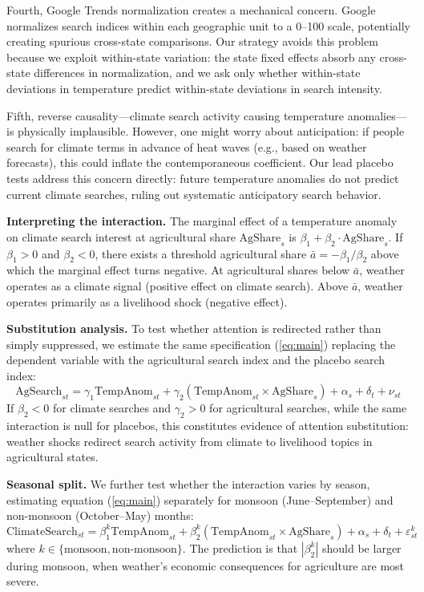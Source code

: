 \documentclass[12pt]{article}
\begin{document}
Fourth, Google Trends normalization creates a mechanical concern. Google normalizes search indices within each geographic unit to a 0--100 scale, potentially creating spurious cross-state comparisons. Our strategy avoids this problem because we exploit within-state variation: the state fixed effects absorb any cross-state differences in normalization, and we ask only whether within-state deviations in temperature predict within-state deviations in search intensity.

Fifth, reverse causality---climate search activity causing temperature anomalies---is physically implausible. However, one might worry about anticipation: if people search for climate terms in advance of heat waves (e.g., based on weather forecasts), this could inflate the contemporaneous coefficient. Our lead placebo tests address this concern directly: future temperature anomalies do not predict current climate searches, ruling out systematic anticipatory search behavior.

\textbf{Interpreting the interaction.} The marginal effect of a temperature anomaly on climate search interest at agricultural share $\text{AgShare}_s$ is $\beta_1 + \beta_2 \cdot \text{AgShare}_s$. If $\beta_1 > 0$ and $\beta_2 < 0$, there exists a threshold agricultural share $\bar{a} = -\beta_1/\beta_2$ above which the marginal effect turns negative. At agricultural shares below $\bar{a}$, weather operates as a climate signal (positive effect on climate search). Above $\bar{a}$, weather operates primarily as a livelihood shock (negative effect).

\textbf{Substitution analysis.} To test whether attention is redirected rather than simply suppressed, we estimate the same specification (\ref{eq:main}) replacing the dependent variable with the agricultural search index and the placebo search index:
\begin{equation}
\label{eq:sub}
\text{AgSearch}_{st} = \gamma_1 \text{TempAnom}_{st} + \gamma_2 (\text{TempAnom}_{st} \times \text{AgShare}_s) + \alpha_s + \delta_t + \nu_{st}
\end{equation}
If $\beta_2 < 0$ for climate searches and $\gamma_2 > 0$ for agricultural searches, while the same interaction is null for placebos, this constitutes evidence of attention substitution: weather shocks redirect search activity from climate to livelihood topics in agricultural states.

\textbf{Seasonal split.} We further test whether the interaction varies by season, estimating equation (\ref{eq:main}) separately for monsoon (June--September) and non-monsoon (October--May) months:
\begin{equation}
\label{eq:season}
\text{ClimateSearch}_{st} = \beta_1^k \text{TempAnom}_{st} + \beta_2^k (\text{TempAnom}_{st} \times \text{AgShare}_s) + \alpha_s + \delta_t + \varepsilon_{st}^k
\end{equation}
where $k \in \{\text{monsoon}, \text{non-monsoon}\}$. The prediction is that $|\beta_2^k|$ should be larger during monsoon, when weather's economic consequences for agriculture are most severe.
\end{document}
